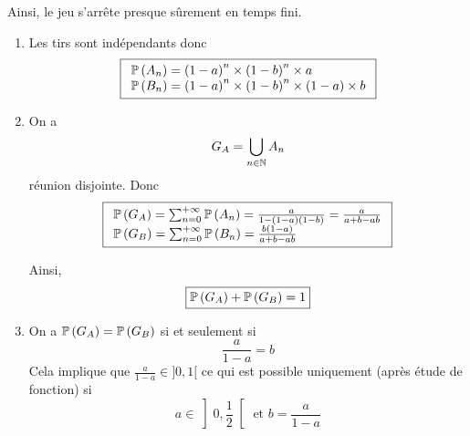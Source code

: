 \begin{solution}
\begin{enumerate}
        Ainsi, le jeu s'arrête presque sûrement en temps fini.
    \end{enumerate}
\end{solution}

\begin{solution}
    \phantom{}
    \begin{enumerate}
        \item Les tirs sont indépendants donc 
        \begin{equation}
            \boxed{
                \begin{array}[]{l}
                    \P\left(A_{n}\right)=\left(1-a\right)^{n}\times\left(1-b\right)^{n}\times a\\
                    \P\left(B_{n}\right)=\left(1-a\right)^{n}\times\left(1-b\right)^{n}\times \left(1-a\right)\times b
                \end{array}
            }    
        \end{equation}
        
        \item On a 
        \begin{equation}
            G_{A}=\bigcup_{n\in\N}A_{n}
        \end{equation}
        réunion disjointe. Donc 
        \begin{equation}
            \boxed{
                \begin{array}[]{l}
                    \P\left(G_{A}\right)=\sum_{n=0}^{+\infty}\P\left(A_{n}\right)=\frac{a}{1-\left(1-a\right)\left(1-b\right)}=\frac{a}{a+b-ab}\\
                    \P\left(G_{B}\right)=\sum_{n=0}^{+\infty}\P\left(B_{n}\right)=\frac{b\left(1-a\right)}{a+b-ab}\\
                \end{array}
            }
        \end{equation}
        
        Ainsi, 
        \begin{equation}
            \boxed{\P\left(G_{A}\right)+\P\left(G_{B}\right)=1}
        \end{equation}

        \item On a $\P\left(G_{A}\right)=\P\left(G_{B}\right)$ si et seulement si 
        \begin{equation}
            \frac{a}{1-a}=b
        \end{equation}
        Cela implique que $\frac{a}{1-a}\in]0,1[$ ce qui est possible uniquement (après étude de fonction) si
        \begin{equation}
            \boxed{a\in\left]0,\frac{1}{2}\right[\text{ et }b=\frac{a}{1-a}}
        \end{equation}
    \end{enumerate}
\end{solution}

